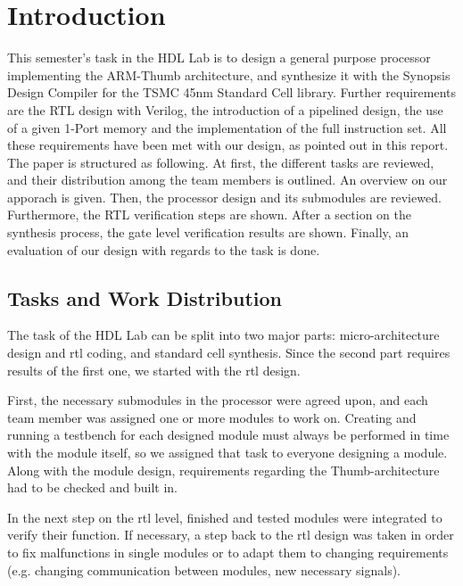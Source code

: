 \chapter{Introduction}
\label{cha:introduction}

This semester's task in the HDL Lab is to design a general purpose processor implementing the ARM-Thumb architecture, and synthesize it with the Synopsis Design Compiler for the TSMC 45nm Standard Cell library. Further requirements are the RTL design with Verilog, the introduction of a pipelined design, the use of a given 1-Port memory and the implementation of the full instruction set. All these requirements have been met with our design, as pointed out in this report.\\ The paper is structured as following. At first, the different tasks are reviewed, and their distribution among the team members is outlined. An overview on our apporach is given. Then, the processor design and its submodules are reviewed. Furthermore, the RTL verification steps are shown. After a section on the synthesis process, the gate level verification results are shown. Finally, an evaluation of our design with regards to the task is done.

\section{Tasks and Work Distribution}
\label{sec:tasksandworkdistribution}

The task of the HDL Lab can be split into two major parts: micro-architecture design and rtl coding, and standard cell synthesis. Since the second part requires results of the first one, we started with the rtl design. 

First, the necessary submodules in the processor were agreed upon, and each team member was assigned one or more modules to work on. Creating and running a testbench for each designed module must always be performed in time with the module itself, so we assigned that task to everyone designing a module. Along with the module design, requirements regarding the Thumb-architecture had to be checked and built in. 

In the next step on the rtl level, finished and tested modules were integrated to verify their function. If necessary, a step back to the rtl design was taken in order to fix malfunctions in single modules or to adapt them to changing requirements (e.g. changing communication between modules, new necessary signals).

